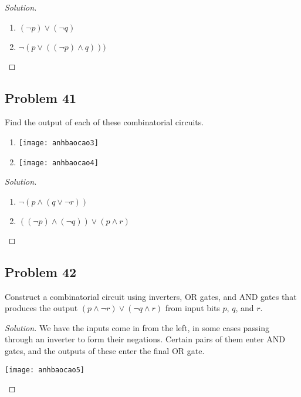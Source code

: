 \documentclass{article}
\newenvironment{solution}{\renewcommand\qedsymbol{}\begin{proof}[Solution]}{\end{proof}}
\begin{document}
\begin{solution}
\hspace{1pt}

\begin{enumerate}[leftmargin=16pt, topsep = 8pt]
\item $(\neg p) \lor (\neg q)$
\item $\neg (p \lor ((\neg p) \land q)))$
\end{enumerate}
\end{solution}

\clearpage
\subsection*{Problem 41}
Find the output of each of these combinatorial circuits.
\begin{enumerate}[leftmargin=16pt, topsep = 8pt]
\item
\begin{adjustbox}{raise = -45pt}
\texttt{[image: anhbaocao3]}
\end{adjustbox}
\item
\begin{adjustbox}{raise = -78pt}
\texttt{[image: anhbaocao4]}
\end{adjustbox}

\end{enumerate}

\begin{solution}
\hspace{1pt}

\begin{enumerate}[leftmargin=16pt, topsep = 8pt]
\item $\neg (p \land (q \lor \neg r))$
\item $((\neg p) \land (\neg q)) \lor (p \land r)$
\end{enumerate}
\end{solution}
\subsection*{Problem 42}
Construct a combinatorial circuit using inverters, OR gates, and AND gates that produces the output $(p \land \neg r) \lor (\neg q \land r)$ from input bits $p$, $q$, and $r$.

\begin{solution}
We have the inputs come in from the left, in some cases passing through an inverter to form their negations. Certain pairs of them enter AND gates, and the outputs of these enter the final OR gate.

\begin{center}
\texttt{[image: anhbaocao5]}
\end{center}
\end{solution}
\end{document}
